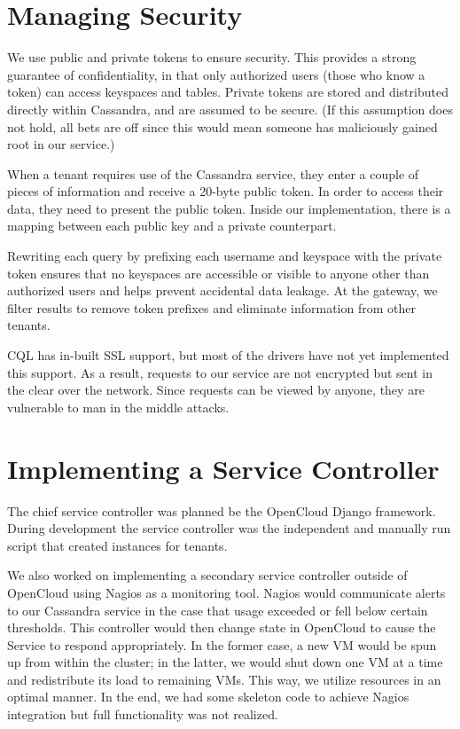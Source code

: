\documentclass[11pt,notitlepage]{report}
\begin{document}
\section*{Managing Security}

We use public and private tokens to ensure security. This provides a strong guarantee of confidentiality, in that only authorized users (those who know a token) can access keyspaces and tables. Private tokens are stored and distributed directly within Cassandra, and are assumed to be secure. (If this assumption does not hold, all bets are off since this would mean someone has maliciously gained root in our service.)

When a tenant requires use of the Cassandra service, they enter a couple of pieces of information and receive a 20-byte public token. In order to access their data, they need to present the public token. Inside our implementation, there is a mapping between each public key and a private counterpart.

Rewriting each query by prefixing each username and keyspace with the private token ensures that no keyspaces are accessible or visible to anyone other than authorized users and helps prevent accidental data leakage. At the gateway, we filter results to remove token prefixes and eliminate information from other tenants.

CQL has in-built SSL support, but most of the drivers have not yet implemented this support. As a result, requests to our service are not encrypted but sent in the clear over the network. Since requests can be viewed by anyone, they are vulnerable to man in the middle attacks.

\section*{Implementing a Service Controller}

The chief service controller was planned be the OpenCloud Django framework. During development the service controller was the independent and manually run script that created instances for tenants.

We also worked on implementing a secondary service controller outside of OpenCloud using Nagios as a monitoring tool. Nagios would communicate alerts to our Cassandra service in the case that usage exceeded or fell below certain thresholds. This controller would then change state in OpenCloud to cause the Service to respond appropriately. In the former case, a new VM would be spun up from within the cluster; in the latter, we would shut down one VM at a time and redistribute its load to remaining VMs. This way, we utilize resources in an optimal manner. In the end, we had some skeleton code to achieve Nagios integration but full functionality was not realized.
\end{document}
